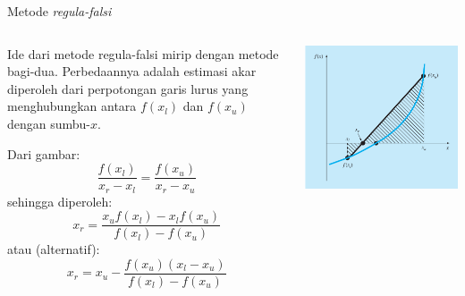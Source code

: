 \begin{frame}{Metode \textit{regula-falsi}}
\fontsize{9}{10}\selectfont

\begin{columns}
  
  \begin{column}{0.5\textwidth}
  Ide dari metode regula-falsi mirip dengan metode bagi-dua. Perbedaannya
  adalah estimasi akar diperoleh dari perpotongan garis lurus yang menghubungkan
  antara $f(x_l)$ dan $f(x_u)$ dengan sumbu-$x$.

  Dari gambar:
  $$
  \frac{f(x_l)}{x_r - x_l} = \frac{f(x_u)}{x_r - x_u}
  $$
  sehingga diperoleh:
  $$
  x_r = \frac{x_u f(x_l) - x_l f(x_u)}{f(x_l) - f(x_u)}
  $$
  atau (alternatif):
  $$
  x_r = x_u - \frac{f(x_u)(x_l - x_u)}{f(x_l) - f(x_u)}
  $$
  \end{column}

  \begin{column}{0.5\textwidth}
  {\centering
  \includegraphics[height=0.7\textheight]{../chapra_7th/Chapra_Fig_5_12.png}
  \par}
  \end{column}

\end{columns}

\end{frame}


